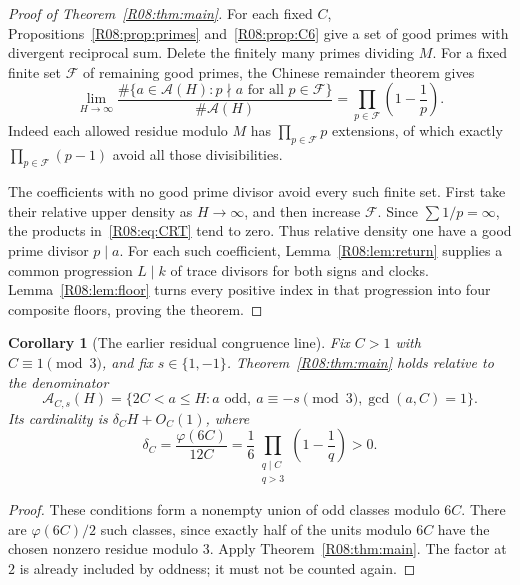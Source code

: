 \documentclass[11pt,a4paper]{article}
\newtheorem{corollary}[theorem]{Corollary}\newtheorem{mainthm}[theorem]{Theorem}
\theoremstyle{definition}\newtheorem{definition}[theorem]{Definition}
\theoremstyle{remark}\newtheorem{remark}[theorem]{Remark}
\begin{document}
\begin{proof}[Proof of Theorem~\ref{R08:thm:main}]
For each fixed $C$, Propositions~\ref{R08:prop:primes} and~\ref{R08:prop:C6}
give a set of good primes with divergent reciprocal sum.
Delete the finitely many primes dividing $M$.
For a fixed finite set $\mathcal F$ of remaining good primes,
the Chinese remainder theorem gives
\begin{equation}\label{R08:eq:CRT}
 \lim_{H\to\infty}
 \frac{\#\{a\in\mathcal A(H):p\nmid a\text{ for all }p\in\mathcal F\}}
      {\#\mathcal A(H)}
                 =\prod_{p\in\mathcal F}\left(1-\frac1p\right).
\end{equation}
Indeed each allowed residue modulo $M$ has $\prod_{p\in\mathcal F}p$
extensions, of which exactly $\prod_{p\in\mathcal F}(p-1)$ avoid all
those divisibilities.

The coefficients with no good prime divisor avoid every such finite set.
First take their relative upper density as $H\to\infty$, and then
increase $\mathcal F$. Since $\sum1/p=\infty$, the products
in~\eqref{R08:eq:CRT} tend to zero. Thus relative density one have a good
prime divisor $p\mid a$.
For each such coefficient, Lemma~\ref{R08:lem:return} supplies a common
progression $L\mid k$ of trace divisors for both signs and clocks.
Lemma~\ref{R08:lem:floor} turns every positive index in that progression
into four composite floors, proving the theorem.
\end{proof}

\begin{corollary}[The earlier residual congruence line]\label{R08:cor:residual}
Fix $C>1$ with $C\equiv1\pmod3$, and fix $s\in\{1,-1\}$.
Theorem~\ref{R08:thm:main} holds relative to the denominator
\[
 \mathcal A_{C,s}(H)=\{2C<a\le H:a\text{ odd},\ a\equiv-s\pmod3,
                                                  \gcd(a,C)=1\}.
\]
Its cardinality is $\delta_C H+O_C(1)$, where
\[
          \delta_C=\frac{\varphi(6C)}{12C}
                =\frac16\prod_{\substack{q\mid C\\q>3}}\left(1-\frac1q\right)>0.
\]
\end{corollary}
\begin{proof}
These conditions form a nonempty union of odd classes modulo $6C$.
There are $\varphi(6C)/2$ such classes, since exactly half of the
units modulo $6C$ have the chosen nonzero residue modulo $3$.
Apply Theorem~\ref{R08:thm:main}. The factor at $2$ is already included
by oddness; it must not be counted again.
\end{proof}
\end{document}
